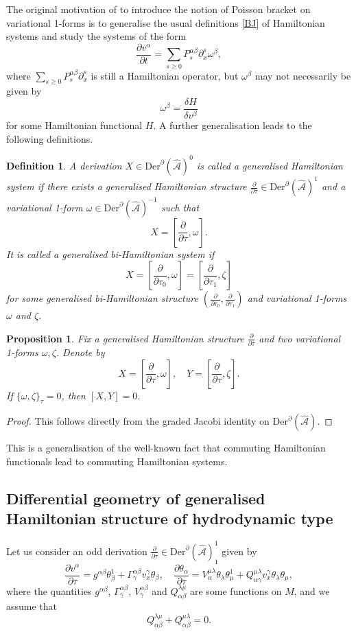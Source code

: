 \documentclass[11pt,a4paper]{amsart}
\numberwithin{equation}{section}
\newtheorem{definition}[theorem]{Definition}
\newtheorem{proposition}[theorem]{Proposition}
\newcommand{\derx}{\mathrm{Der}^{\qp}(\hm A)}
\newcommand{\diff}[2]{\frac{\partial #1}{\partial #2}}
\newcommand{\qa}{\alpha}
\newcommand{\qb}{\beta}
\newcommand{\qg}{\gamma}
\newcommand{\qt}{\tau}
\newcommand{\qth}{\theta}
\newcommand{\qz}{\zeta}
\newcommand{\qp}{\partial}
\newcommand{\qo}{\omega}
\newcommand{\Qg}{\Gamma}
\newcommand{\ql}{\lambda}
\newcommand{\vard}[2]{\frac{\delta #1}{\delta #2}}
\newcommand{\hm}[1]{\hat{\mathcal #1}}
\newcommand{\fk}[2]{\left[#1, #2\right]}
\numberwithin{equation}{section}
\begin{document}
The original motivation of \cite{AL12} to introduce the notion of Poisson bracket on variational 1-forms is to generalise the usual definitions \eqref{BJ} of Hamiltonian systems and study the systems of the form 
\begin{equation}
  \label{BW}
\diff{v^\qa}{t} = \sum_{s\geq 0}P^{\qa\qb}_s\qp_x^s\qo^\qb,
\end{equation}
where $\sum_{s\geq 0}P^{\qa\qb}_s\qp_x^s$ is still a Hamiltonian operator, but $\qo^\qb$ may not necessarily be given by 
\[
\qo^\qb = \vard{H}{v^\qb}
\]
for some Hamiltonian functional $H$. A further generalisation leads to the following definitions. 
\begin{definition}
  \label{BL}
  A derivation $X\in\derx^0$ is called a generalised Hamiltonian system if there exists a generalised Hamiltonian structure $\diff{}{\qt}\in\derx^{1}$ and a variational 1-form $\qo\in\derx^{-1}$ such that 
  \begin{equation}
    \label{BX}
  X = \fk{\diff{}{\qt}}{\qo}.
  \end{equation}
  It is called a generalised bi-Hamiltonian system if 
  \[
  X = \fk{\diff{}{\qt_0}}{\qo}=\fk{\diff{}{\qt_1}}{\qz}
  \]
  for some generalised bi-Hamiltonian structure $(\diff{}{\qt_0},\diff{}{\qt_1})$ and variational 1-forms $\qo$ and $\qz$.
\end{definition} 

\begin{proposition}
  Fix a generalised Hamiltonian structure $\diff{}{\qt}$ and two variational 1-forms $\qo, \qz$. Denote by 
  \[
  X = \fk{\diff{}{\qt}}{\qo},\quad Y = \fk{\diff{}{\qt}}{\qz}.
  \]
  If $\{\qo,\qz\}_\qt = 0$, then $[X,Y] = 0$.
\end{proposition}
\begin{proof}
  This follows directly from the graded Jacobi identity on $\derx$.
\end{proof}

This is a generalisation of the well-known fact that commuting Hamiltonian functionals lead to commuting Hamiltonian systems.



\subsection{Differential geometry of generalised Hamiltonian structure of hydrodynamic type}
Let us consider an odd derivation $\diff{}{\qt}\in\derx^1_1$ given by 
\begin{equation}
  \label{AD} 
  \diff{v^\qa}{\qt} = g^{\qa\qb}\qth_\qb^1+\Qg^{\qa\qb}_\qg v^\qg_x\qth_\qb,\quad \diff{\qth_\qa}{\qt} = V_\qa^{\mu\ql}\qth_\ql\qth_\mu^1+Q^{\mu\ql}_{\qa\qg}v^\qg_x\qth_\ql\qth_\mu,
\end{equation}
where the quantities $g^{\qa \qb}$, $\Qg^{\qa\qb}_\qg$, $V^{\qa\qb}_\qg$ and $Q^{\ql\mu}_{\qa\qb}$ are some functions on $M$, and we assume that 
\[
Q^{\ql\mu}_{\qa\qb}+Q^{\mu\ql}_{\qa\qb} = 0.
\]
\end{document}
